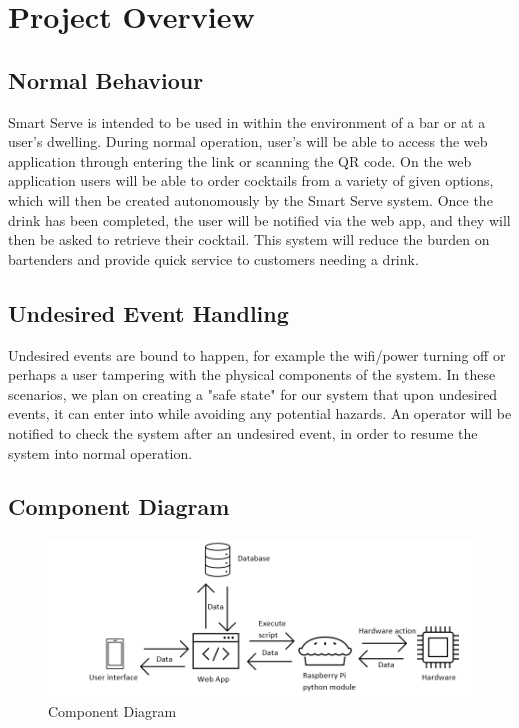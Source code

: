 \documentclass[12pt, titlepage]{article}
\begin{document}
\section{Project Overview}

\subsection{Normal Behaviour}
Smart Serve is intended to be used in within the environment of a bar or at a user's dwelling. During normal operation, user's will be able to access the web application through entering the link or scanning the QR code. On the web application users will be able to order cocktails from a variety of given options, which will then be created autonomously by the Smart Serve system. Once the drink has been completed, the user will be notified via the web app, and they will then be asked to retrieve their cocktail. This system will reduce the burden on bartenders and provide quick service to customers needing a drink.

\subsection{Undesired Event Handling}
Undesired events are bound to happen, for example the wifi/power turning off or perhaps a user tampering with the physical components of the system. In these scenarios, we plan on creating a "safe state" for our system that upon undesired events, it can enter into while avoiding any potential hazards. An operator will be notified to check the system after an undesired event, in order to resume the system into normal operation.

\subsection{Component Diagram}
\begin{figure}[H]
    \centerline{\includegraphics[scale=.5]{componentdiagram.png}}
    \caption{Component Diagram}
    \label{fig}
\end{figure}
\end{document}
